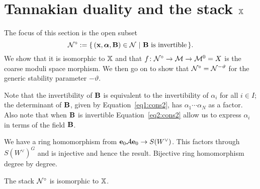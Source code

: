 \documentclass{amsart}
\newcommand{\balpha}{\boldsymbol{\alpha}}
\theoremstyle{definition}
\begin{document}
\section{Tannakian duality and the stack $\mathbb{X}$}

The focus of this section is the open subset $$\cN^\circ:= \{\,(\bfx, \balpha, \bfB) \in \cN \,\,|\,\, \bfB \text{ is invertible} \,\}.$$
We show that it is isomorphic to $\mathbb{X}$ and that $f \colon \mathcal{N}^\circ \rightarrow \mathcal{M} \rightarrow \mathcal{M}^0=X$ is the coarse moduli space morphism.
We then go on to show that $\mathcal{N}^\circ = \mathcal{N}^{-\vartheta}$ for the generic stability parameter $-\vartheta$.

Note that the invertibility of $\mathbf{B}$ is equivalent to the invertibility of $\alpha_i$ for all $i \in I$; the determinant of $\mathbf{B}$, given by Equation~\ref{eq1:cons2}, has $\alpha_1 \cdots \alpha_N$ as a factor.
Also note that when $\mathbf{B}$ is invertible Equation~\ref{eq2:cons2} allow us to express $\alpha_i$ in terms of the field $\mathbf{B}$.

We have a ring homomorphism from $\mathbf{e}_0 \mathcal{A} \mathbf{e}_0 \rightarrow S(W^\vee)$.
This factors through $S(W^\vee)^G$ and is injective and hence the result.
Bijective ring homomorphism degree by degree.

\begin{theorem}\label{thm:tannaka}
The stack ${\mathcal{N}}^\circ$ is isomorphic to $\mathbb{X}$.
\end{theorem}
\end{document}
